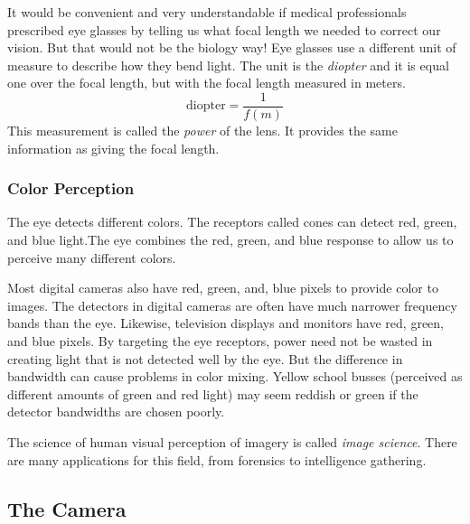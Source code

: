 \documentclass{article}
\begin{document}
It would be convenient and very understandable if medical professionals
prescribed eye glasses by telling us what focal length we needed to correct
our vision. But that would not be the biology way! Eye glasses use a
different unit of measure to describe how they bend light. The unit is the 
\emph{diopter} and it is equal one over the focal length, but with the focal
length measured in meters. 
\begin{equation}
\text{diopter}=\frac{1}{f\left( \unit{m}\right) }
\end{equation}%
This measurement is called the \emph{power }of the lens. It provides the
same information as giving the focal length.

\subsubsection{Color Perception}

The eye detects different colors. The receptors called cones can detect red,
green, and blue light.The eye combines the red, green,
and blue response to allow us to perceive many different colors.

Most digital cameras also have red, green, and, blue pixels to provide color
to images. The detectors in digital cameras are often have much narrower
frequency bands than the eye. Likewise, television displays and monitors
have red, green, and blue pixels. By targeting the eye receptors, power need
not be wasted in creating light that is not detected well by the eye. But
the difference in bandwidth can cause problems in color mixing. Yellow
school busses (perceived as different amounts of green and red light) may
seem reddish or green if the detector bandwidths are chosen poorly.

The science of human visual perception of imagery is called \emph{image
science}. There are many applications for this field, from forensics to
intelligence gathering.

\subsection{The Camera}
\end{document}
